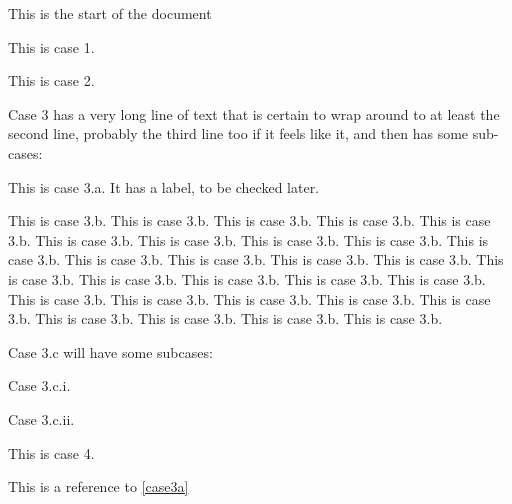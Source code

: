 \documentclass{article}
\begin{document}
This is the start of the document

\begin{proofcases}
	\item This is case 1.

	\item This is case 2.

	\item Case 3 has a very long line of text that is certain to wrap
	around to at least the second line, probably the third line too if
	it feels like it, and then has some sub-cases:

	\begin{proofcases}
		\item\label{case3a} This is case 3.a.  It has a label, to be
		checked later.
	
		\item This is case 3.b. This is case 3.b. This is case 3.b. This is case 3.b. This is case 3.b. 
		This is case 3.b. This is case 3.b. This is case 3.b. This is case 3.b. This is case 3.b.
		This is case 3.b. This is case 3.b. This is case 3.b. This is case 3.b. This is case 3.b.
		This is case 3.b. This is case 3.b. This is case 3.b. This is case 3.b. This is case 3.b.
		This is case 3.b. This is case 3.b. This is case 3.b. This is case 3.b. This is case 3.b.
		This is case 3.b. This is case 3.b. This is case 3.b.
	
		\item Case 3.c will have some subcases:
		\begin{proofcases}
			\item Case 3.c.i.
			\item Case 3.c.ii.
		\end{proofcases}
	\end{proofcases}

	\item This is case 4.
\end{proofcases}

This is a reference to \cref{case3a}
\end{document}
